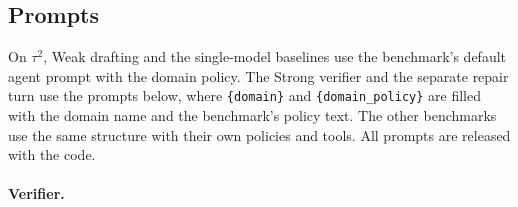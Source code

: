 \documentclass[11pt, copyright, logo, secondlogo]{template/lark}
\begin{document}
\subsection{Prompts}
\label{sec:appendix_prompts}

On $\tau^2$, Weak drafting and the single-model baselines use the benchmark's
default agent prompt with the domain policy. The Strong verifier and the
separate repair turn use the prompts below, where \texttt{\{domain\}} and
\texttt{\{domain\_policy\}} are filled with the domain name and the
benchmark's policy text. The other benchmarks use the same
structure with their own policies and tools. All prompts are released with
the code.

\paragraph{Verifier.}
\end{document}
